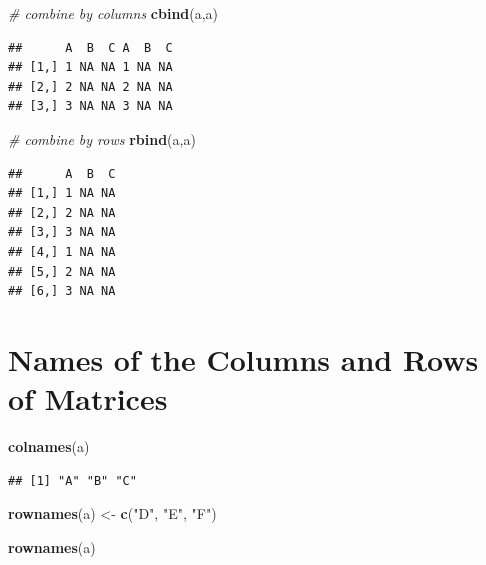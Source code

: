 \documentclass[]{book}
\newenvironment{Shaded}{\begin{snugshade}}{\end{snugshade}}
\newcommand{\KeywordTok}[1]{\textcolor[rgb]{0.13,0.29,0.53}{\textbf{{#1}}}}
\newcommand{\StringTok}[1]{\textcolor[rgb]{0.31,0.60,0.02}{{#1}}}
\newcommand{\CommentTok}[1]{\textcolor[rgb]{0.56,0.35,0.01}{\textit{{#1}}}}
\newcommand{\NormalTok}[1]{{#1}}
\begin{document}
\begin{Shaded}
\begin{Highlighting}[]
\CommentTok{# combine by columns}
\KeywordTok{cbind}\NormalTok{(a,a)   }
\end{Highlighting}
\end{Shaded}

\begin{verbatim}
##      A  B  C A  B  C
## [1,] 1 NA NA 1 NA NA
## [2,] 2 NA NA 2 NA NA
## [3,] 3 NA NA 3 NA NA
\end{verbatim}

\begin{Shaded}
\begin{Highlighting}[]
\CommentTok{# combine by rows}
\KeywordTok{rbind}\NormalTok{(a,a)   }
\end{Highlighting}
\end{Shaded}

\begin{verbatim}
##      A  B  C
## [1,] 1 NA NA
## [2,] 2 NA NA
## [3,] 3 NA NA
## [4,] 1 NA NA
## [5,] 2 NA NA
## [6,] 3 NA NA
\end{verbatim}

\section{Names of the Columns and Rows of
Matrices}\label{names-of-the-columns-and-rows-of-matrices}

\begin{Shaded}
\begin{Highlighting}[]
\KeywordTok{colnames}\NormalTok{(a) }
\end{Highlighting}
\end{Shaded}

\begin{verbatim}
## [1] "A" "B" "C"
\end{verbatim}

\begin{Shaded}
\begin{Highlighting}[]
\KeywordTok{rownames}\NormalTok{(a) <-}\StringTok{ }\KeywordTok{c}\NormalTok{(}\StringTok{"D"}\NormalTok{, }\StringTok{"E"}\NormalTok{, }\StringTok{"F"}\NormalTok{)}
\end{Highlighting}
\end{Shaded}

\begin{Shaded}
\begin{Highlighting}[]
\KeywordTok{rownames}\NormalTok{(a)}
\end{Highlighting}
\end{Shaded}
\end{document}
